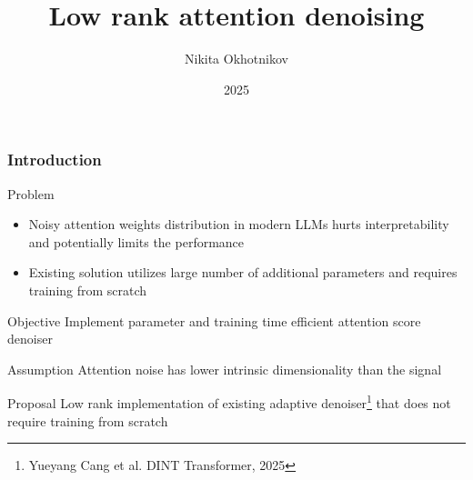 \documentclass[10pt]{beamer}
\title[]{Low rank attention denoising}
\author{Nikita Okhotnikov}
\institute{MIPT}
\date{2025}
\begin{document}
\begin{frame}
  \titlepage{}
\end{frame}


\begin{frame}
    \frametitle{Introduction}
    \begin{block}{Problem}
        \begin{itemize}
            \item Noisy attention weights distribution in modern LLMs hurts interpretability and potentially limits the performance
            \item Existing solution utilizes large number of additional parameters and requires training from scratch
        \end{itemize}
    \end{block}
    \begin{block}{Objective}
        Implement parameter and training time efficient attention score denoiser      
    \end{block}
    \begin{block}{Assumption}
        Attention noise has lower intrinsic dimensionality than the signal
    \end{block}
    \begin{block}{Proposal}
        Low rank implementation of existing adaptive denoiser\footnote{Yueyang Cang et al. DINT Transformer, 2025} that does not require training from scratch
    \end{block}
\end{frame}
\end{document}
